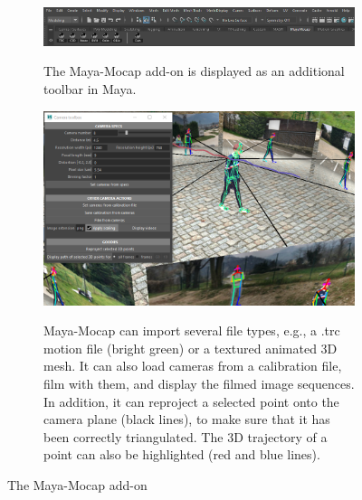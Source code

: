 \begin{figure}[h!]
	\centering
	\begin{subfigure}[b]{1\textwidth}
		\centering
		\def\svgwidth{\columnwidth}
		\fontsize{10pt}{10pt}\selectfont
		\href{https://github.com/davidpagnon/Maya-Mocap}{
                  \includegraphics[width=\linewidth]{"../Chap3/Figures/Fig_MayaMocap1.png"}
            }
            \caption{The Maya-Mocap add-on is displayed as an additional toolbar in Maya.}
      \end{subfigure}
	\qquad
	\begin{subfigure}[b]{1\textwidth}
		\centering
		\def\svgwidth{\columnwidth}
		\fontsize{10pt}{10pt}\selectfont
		\href{https://github.com/davidpagnon/Maya-Mocap}{
                  \includegraphics[width=\linewidth]{"../Chap3/Figures/Fig_MayaMocap2.png"}
            }
            \caption{Maya-Mocap can import several file types, e.g., a .trc motion file (bright green) or a textured animated 3D mesh. It can also load cameras from a calibration file, film with them, and display the filmed image sequences. In addition, it can reproject a selected point onto the camera plane (black lines), to make sure that it has been correctly triangulated. The 3D trajectory of a point can also be highlighted (red and blue lines).}
      \end{subfigure}
      \caption{The Maya-Mocap add-on}
	\label{fig_mayamocap}
\end{figure}

